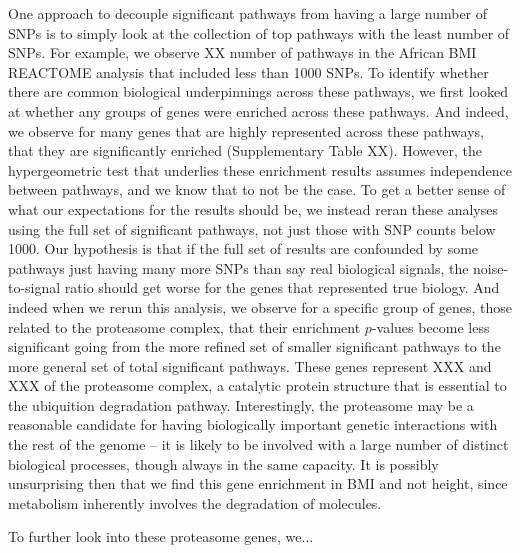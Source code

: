 \documentclass[12pt, a4paper]{article}
\begin{document}
One approach to decouple significant pathways from having a large number of SNPs is to simply look at the collection of top pathways with the least number of SNPs. For example, we observe XX number of pathways in the African BMI REACTOME analysis that included less than 1000 SNPs. To identify whether there are common biological underpinnings across these pathways, we first looked at whether any groups of genes were enriched across these pathways. And indeed, we observe for many genes that are highly represented across these pathways, that they are significantly enriched (Supplementary Table XX). However, the hypergeometric test that underlies these enrichment results assumes independence between pathways, and we know that to not be the case. To get a better sense of what our expectations for the results should be, we instead reran these analyses using the full set of significant pathways, not just those with SNP counts below 1000. Our hypothesis is that if the full set of results are confounded by some pathways just having many more SNPs than say real biological signals, the noise-to-signal ratio should get worse for the genes that represented true biology. And indeed when we rerun this analysis, we observe for a specific group of genes, those related to the proteasome complex, that their enrichment $p$-values become less significant going from the more refined set of smaller significant pathways to the more general set of total significant pathways. These genes represent XXX and XXX of the proteasome complex, a catalytic protein structure that is essential to the ubiquition degradation pathway. Interestingly, the proteasome may be a reasonable candidate for having biologically important genetic interactions with the rest of the genome -- it is likely to be involved with a large number of distinct biological processes, though always in the same capacity. It is possibly unsurprising then that we find this gene enrichment in BMI and not height, since metabolism inherently involves the degradation of molecules. 

To further look into these proteasome genes, we...
\end{document}
